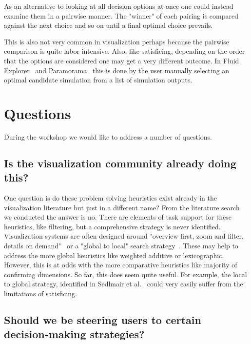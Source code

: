 As an alternative to looking at all decision options at once one could 
instead examine them in a pairwise manner. The "winner" of each pairing is
compared against the next choice and so on until a final optimal choice
prevails.

This is also not very common in visualization perhaps because the pairwise
comparison is quite labor intensive. Also, like satisficing, depending on the
order that the options are considered one may get a very different outcome. In
Fluid Explorer~\cite{Bruckner:2010} and Paramorama~\citep{Pretorius:2011} this
is done by the user manually selecting an optimal candidate simulation from 
a list of simulation outputs.


\section{Questions}\label{questions}

During the workshop we would like to address a number of questions.

\subsection{Is the visualization community already doing this?}
\label{is-vis-already-doing-this}

One question is do these problem solving heuristics exist already in the
visualization literature but just in a different name? From the literature
search we conducted the answer is no. There are elements of task support for
these heuristics, like filtering, but a comprehensive strategy is never
identified. Visualization systems are often designed around 
"overview first, zoom and filter, details on demand"~\cite{Shneiderman:1996} or
a "global to local" search strategy~\cite{Sedlmair:2014}. These may help to
address the more global heuristics like weighted additive or lexicographic.
However, this is at odds with the more comparative heuristics like majority
of confirming dimensions. 
So far, this does seem quite useful. For example, the local to global
strategy, identified in Sedlmair et al.~\citep{Sedlmair:2014} could very
easily suffer from the limitations of satisficing.

\subsection{Should we be steering users to certain decision-making strategies?}

